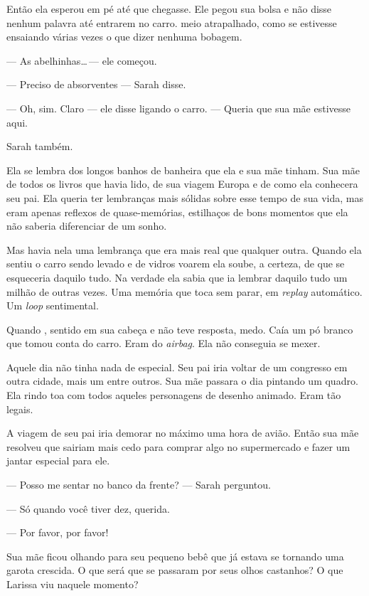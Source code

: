 Então ela esperou em pé até que  chegasse. Ele pegou sua bolsa e não disse nenhum palavra até entrarem no carro.  meio atrapalhado, como se estivesse ensaiando várias vezes o que dizer  nenhuma bobagem.

--- As abelhinhas\ldots\,--- ele começou.

--- Preciso de absorventes --- Sarah disse.

--- Oh, sim. Claro --- ele disse\mudanca{,} ligando o carro. --- Queria que sua mãe estivesse aqui.

Sarah também.

Ela se lembra dos longos banhos de banheira que ela e sua mãe tinham. Sua mãe  de todos os livros que havia lido, de sua viagem  Europa e de como ela conhecera seu pai. Ela queria ter lembranças mais sólidas sobre esse tempo de sua vida, mas eram apenas reflexos de quase-memórias, estilhaços de bons momentos que ela não saberia diferenciar de um sonho.

Mas havia nela uma lembrança que era mais real que qualquer outra. Quando ela sentiu o carro sendo levado e  de vidros voarem ela soube,  a certeza, de que  se esqueceria daquilo tudo. Na verdade\mudanca{,} ela sabia que ia lembrar daquilo tudo um milhão de outras vezes. Uma memória que toca sem parar, em \emph{replay} automático. Um \emph{loop} sentimental.

Quando , sentido  em sua cabeça e não teve resposta,  medo. Caía um pó branco que tomou conta do carro. Eram do \emph{airbag}. Ela não conseguia se mexer.

Aquele dia não tinha nada de especial. Seu pai iria voltar de um congresso em outra cidade, mais um entre  outros. Sua mãe passara o dia pintando um quadro. Ela rindo  toa com todos aqueles personagens de desenho animado. Eram tão legais.

A viagem de seu pai iria demorar no máximo uma hora de avião. Então sua mãe resolveu que sairiam mais cedo para comprar algo no supermercado e fazer um jantar especial para ele.

--- Posso me sentar no banco da frente? --- Sarah perguntou.

--- Só quando você tiver dez, querida.

--- Por favor, por favor!

Sua mãe ficou olhando para seu pequeno bebê\mudanca{,} que já estava se tornando uma garota crescida. O que será que se passaram por seus olhos castanhos? O que Larissa viu naquele momento?

